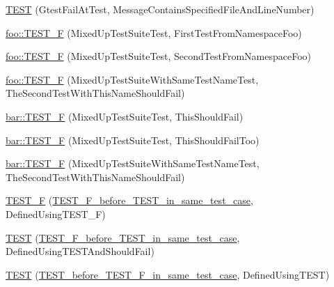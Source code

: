 \begin{DoxyCompactItemize}
\item 
\mbox{\hyperlink{googletest-master_2googletest_2test_2googletest-output-test___8cc_a55ed27923966fd2997638340ff07caa1}{T\+E\+ST}} (Gtest\+Fail\+At\+Test, Message\+Contains\+Specified\+File\+And\+Line\+Number)
\item 
\mbox{\hyperlink{namespacefoo_a849b0cc834d25429f0391db7e0eb9dc1}{foo\+::\+T\+E\+S\+T\+\_\+F}} (Mixed\+Up\+Test\+Suite\+Test, First\+Test\+From\+Namespace\+Foo)
\item 
\mbox{\hyperlink{namespacefoo_a5e6f45cc38f6752f717235b183163550}{foo\+::\+T\+E\+S\+T\+\_\+F}} (Mixed\+Up\+Test\+Suite\+Test, Second\+Test\+From\+Namespace\+Foo)
\item 
\mbox{\hyperlink{namespacefoo_afced5d7fbc3e96e3309591e09fbae5c4}{foo\+::\+T\+E\+S\+T\+\_\+F}} (Mixed\+Up\+Test\+Suite\+With\+Same\+Test\+Name\+Test, The\+Second\+Test\+With\+This\+Name\+Should\+Fail)
\item 
\mbox{\hyperlink{namespacebar_a95397ed83e5072747d6333cbfae5ea0e}{bar\+::\+T\+E\+S\+T\+\_\+F}} (Mixed\+Up\+Test\+Suite\+Test, This\+Should\+Fail)
\item 
\mbox{\hyperlink{namespacebar_ae02a29b454cf88337a77336c2bf1f0a4}{bar\+::\+T\+E\+S\+T\+\_\+F}} (Mixed\+Up\+Test\+Suite\+Test, This\+Should\+Fail\+Too)
\item 
\mbox{\hyperlink{namespacebar_a23b15d10e91f920a5ed07ae9f27916df}{bar\+::\+T\+E\+S\+T\+\_\+F}} (Mixed\+Up\+Test\+Suite\+With\+Same\+Test\+Name\+Test, The\+Second\+Test\+With\+This\+Name\+Should\+Fail)
\item 
\mbox{\hyperlink{googletest-master_2googletest_2test_2googletest-output-test___8cc_ae71a8d4934e768af615b9b09418f15c3}{T\+E\+S\+T\+\_\+F}} (\mbox{\hyperlink{class_t_e_s_t___f__before___t_e_s_t__in__same__test__case}{T\+E\+S\+T\+\_\+\+F\+\_\+before\+\_\+\+T\+E\+S\+T\+\_\+in\+\_\+same\+\_\+test\+\_\+case}}, Defined\+Using\+T\+E\+S\+T\+\_\+F)
\item 
\mbox{\hyperlink{googletest-master_2googletest_2test_2googletest-output-test___8cc_a4b026b84b5a6dcbfa586f406e7c6b79c}{T\+E\+ST}} (\mbox{\hyperlink{class_t_e_s_t___f__before___t_e_s_t__in__same__test__case}{T\+E\+S\+T\+\_\+\+F\+\_\+before\+\_\+\+T\+E\+S\+T\+\_\+in\+\_\+same\+\_\+test\+\_\+case}}, Defined\+Using\+T\+E\+S\+T\+And\+Should\+Fail)
\item 
\mbox{\hyperlink{googletest-master_2googletest_2test_2googletest-output-test___8cc_a80bcd554d66913b961ad814266a403a8}{T\+E\+ST}} (\mbox{\hyperlink{class_t_e_s_t__before___t_e_s_t___f__in__same__test__case}{T\+E\+S\+T\+\_\+before\+\_\+\+T\+E\+S\+T\+\_\+\+F\+\_\+in\+\_\+same\+\_\+test\+\_\+case}}, Defined\+Using\+T\+E\+ST)

\end{DoxyCompactItemize}
